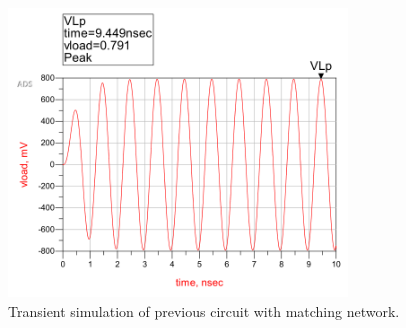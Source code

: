 \begin{figure}[H] 
\centering
\includegraphics[width=9cm]{images/p2plot1.png}
\caption{Transient simulation of previous circuit with matching network.}
\label{p2:plot1} 
\end{figure}

